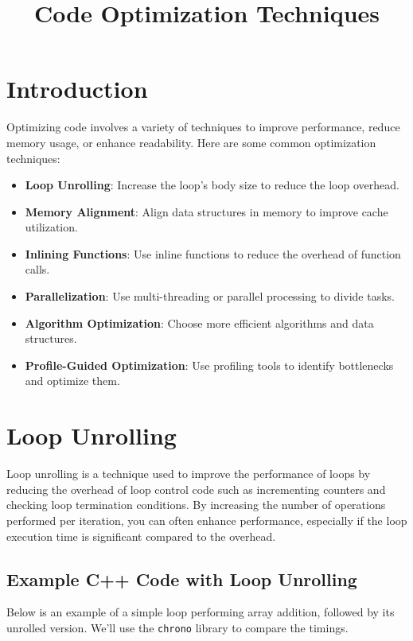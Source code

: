 \documentclass{article}
\begin{document}
	
	\title{Code Optimization Techniques}
	\author{}
	\date{}
	\maketitle
	
	\section{Introduction}
	Optimizing code involves a variety of techniques to improve performance, reduce memory usage, or enhance readability. Here are some common optimization techniques:
	
	\begin{itemize}
		\item \textbf{Loop Unrolling}: Increase the loop's body size to reduce the loop overhead.
		\item \textbf{Memory Alignment}: Align data structures in memory to improve cache utilization.
		\item \textbf{Inlining Functions}: Use inline functions to reduce the overhead of function calls.
		\item \textbf{Parallelization}: Use multi-threading or parallel processing to divide tasks.
		\item \textbf{Algorithm Optimization}: Choose more efficient algorithms and data structures.
		\item \textbf{Profile-Guided Optimization}: Use profiling tools to identify bottlenecks and optimize them.
	\end{itemize}


	
	\section{Loop Unrolling}
	Loop unrolling is a technique used to improve the performance of loops by reducing the overhead of loop control code such as incrementing counters and checking loop termination conditions. By increasing the number of operations performed per iteration, you can often enhance performance, especially if the loop execution time is significant compared to the overhead.
	
	\subsection{Example C++ Code with Loop Unrolling}
	Below is an example of a simple loop performing array addition, followed by its unrolled version. We'll use the \texttt{chrono} library to compare the timings.
	
\end{document}

